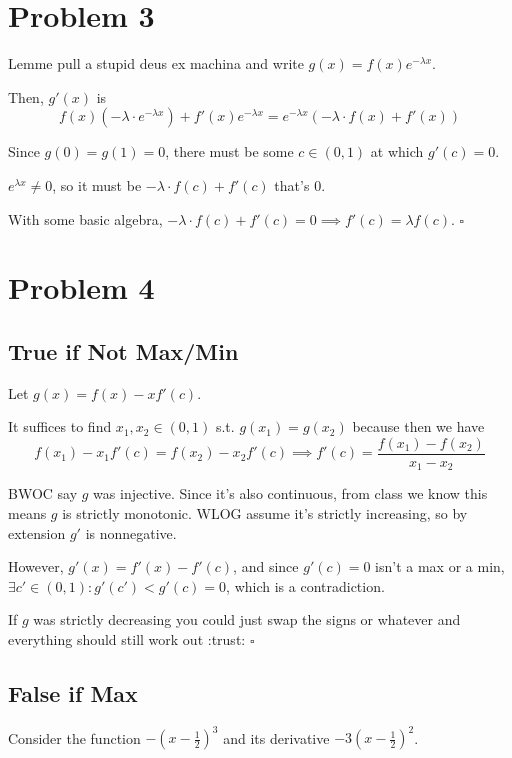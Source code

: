 \documentclass[12pt]{article}
\begin{document}
\pagebreak

\section{Problem 3}

Lemme pull a stupid deus ex machina and write $g(x)=f(x)e^{-\lambda x}$.

Then, $g'(x)$ is
\[f(x)\left(-\lambda \cdot e^{-\lambda x}\right)+f'(x)e^{-\lambda x}=e^{-\lambda x}(-\lambda \cdot f(x)+f'(x))\]

Since $g(0)=g(1)=0$, there must be some $c \in (0, 1)$ at which $g'(c)=0$.

$e^{\lambda x} \ne 0$, so it must be $-\lambda \cdot f(c)+f'(c)$ that's $0$.

With some basic algebra, $-\lambda \cdot f(c)+f'(c)=0 \implies f'(c)=\lambda f(c)$. $\square$

\section{Problem 4}

\subsection{True if Not Max/Min}

Let $g(x)=f(x)-xf'(c)$.

It suffices to find $x_1, x_2 \in (0, 1)$ s.t. $g(x_1)=g(x_2)$ because then we have
\[f(x_1)-x_1f'(c)=f(x_2)-x_2f'(c) \implies f'(c)=\frac{f(x_1)-f(x_2)}{x_1-x_2}\]

BWOC say $g$ was injective.
Since it's also continuous, from class we know this means
$g$ is strictly monotonic.
WLOG assume it's strictly increasing, so by extension $g'$ is nonnegative.

However, $g'(x)=f'(x)-f'(c)$, and since $g'(c)=0$ isn't a max or a min,
$\exists c' \in (0, 1): g'(c') < g'(c)=0$, which is a contradiction.

If $g$ was strictly decreasing you could just swap the signs or
whatever and everything should still work out :trust: $\square$

\subsection{False if Max}

Consider the function $-\left(x-\frac{1}{2}\right)^3$
and its derivative $-3\left(x-\frac{1}{2}\right)^2$.
\end{document}
